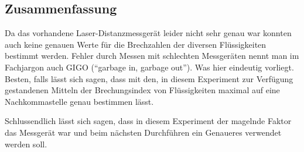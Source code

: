 \documentclass[11pt,ngerman]{scrartcl}
\begin{document}
\subsection{Zusammenfassung}
Da das vorhandene Laser-Distanzmessgerät leider nicht sehr genau
war konnten auch keine genauen Werte für die Brechzahlen der 
diversen Flüssigkeiten bestimmt werden. Fehler durch Messen mit schlechten
Messgeräten nennt man im Fachjargon auch GIGO (``garbage in, garbage out'').
Was hier eindeutig vorliegt. Besten, falls lässt sich sagen, dass mit den,
in diesem Experiment zur Verfügung gestandenen Mitteln der Brechungsindex 
von Flüssigkeiten maximal auf eine Nachkommastelle genau bestimmen lässt.

Schlussendlich lässt sich sagen, dass in diesem Experiment der magelnde Faktor
das Messgerät war und beim nächsten Durchführen ein Genaueres verwendet werden soll.

\newpage
\printbibliography

\listoffigures

\listoftables
\end{document}

